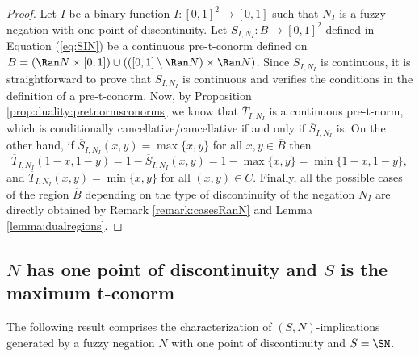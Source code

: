 \begin{proof}
	Let $I$ be a binary function $I:[0,1]^2 \to [0,1]$ such that $N_I$ is a fuzzy negation with one point of discontinuity. Let $S_{I,N_I}: B \to [0,1]^2$ defined in Equation (\ref{eq:SIN}) be a continuous pre-t-conorm defined on $B=(\Ran N \times [0,1]) \cup (([0,1] \setminus \Ran N) \times \Ran N)$. Since $S_{I,N_I}$ is continuous, it is straightforward to prove that $\overline{S}_{I,N_I}$ is continuous and  verifies the conditions in the definition of a pre-t-conorm. Now, by Proposition \ref{prop:duality:pretnormsconorms} we know that $\overline{T}_{I,N_I}$ is a continuous pre-t-norm, which is conditionally cancellative/cancellative if and only if $\overline{S}_{I,N_I}$ is. On the other hand, if $\overline{S}_{I,N_I}(x,y)=\max\{x,y\}$ for all $x,y \in \overline{B}$ then
	$$\overline{T}_{I,N_I}(1-x,1-y)=1-\overline{S}_{I,N_I}(x,y)= 1-\max\{x,y\}= \min \{1-x,1-y\},$$
	and $\overline{T}_{I,N_I}(x,y)=\min\{x,y\}$ for all $(x,y) \in C$. Finally, all the possible cases of the region $\overline{B}$ depending on the type of discontinuity of the negation $N_I$ are directly obtained by Remark \ref{remark:casesRanN} and Lemma \ref{lemma:dualregions}.
\end{proof}

\subsection{$N$ has one point of discontinuity and $S$ is the maximum t-conorm}

The following result comprises the characterization of $(S,N)$-implications generated by a fuzzy negation $N$ with one point of discontinuity and $S=\SM$.

